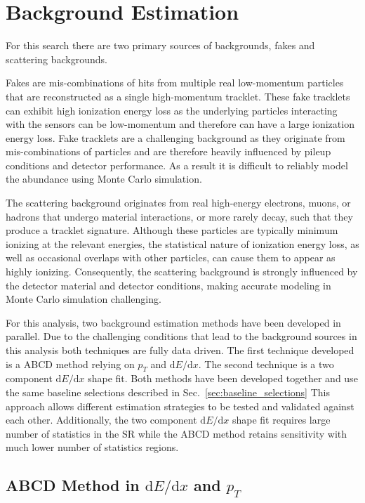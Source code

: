 \section{Background Estimation}


For this search there are two primary sources of backgrounds,  fakes and scattering backgrounds. 

Fakes are mis-combinations of hits from multiple real low-momentum particles that are reconstructed as a single high-momentum tracklet. 
These fake tracklets can exhibit high ionization energy loss as the underlying particles interacting with the sensors can be low-momentum and therefore can have a large ionization energy loss. 
Fake tracklets are a challenging background as they originate from mis-combinations of particles and are therefore heavily influenced by pileup conditions and detector performance.
As a result it is difficult to reliably model the abundance using Monte Carlo simulation. 

The scattering background originates from real high-energy electrons, muons, or hadrons that undergo material interactions, or more rarely decay, such that they produce a tracklet signature. 
Although these particles are typically minimum ionizing at the relevant energies, the statistical nature of ionization energy loss, as well as occasional overlaps with other particles, can cause them to appear as highly ionizing. 
Consequently, the scattering background is strongly influenced by the detector material and detector conditions, making accurate modeling in Monte Carlo simulation challenging.

For this analysis, two background estimation methods have been developed in parallel.
Due to the challenging conditions that lead to the background sources in this analysis both techniques are fully data driven. 
The first technique developed is a ABCD method relying on $p_T$ and $\text{d}E/\text{d}x$.
The second technique is a two component $\text{d}E/\text{d}x$ shape fit.
Both methods have been developed together and use the same baseline selections described in Sec.~\ref{sec:baseline_selections}
This approach allows different estimation strategies to be tested and validated against each other.
Additionally, the two component $\text{d}E/\text{d}x$ shape fit requires large number of statistics in the SR while the ABCD method retains sensitivity with much lower number of statistics regions.
\subsection{ABCD Method in $\text{d}E/\text{d}x$ and $p_T$}
\label{sec:Background_Estimation_ABCD_in_dEdx_and_pT}

